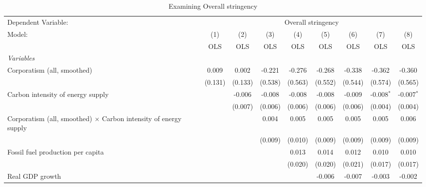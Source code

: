 
\begin{table}[htbp]
   \caption{Examining Overall stringency}
   \centering
   \begin{tabular}{lcccccccc}
      \toprule
      Dependent Variable: & \multicolumn{8}{c}{Overall stringency}\\
      Model:                                                                  & (1)     & (2)     & (3)     & (4)     & (5)     & (6)     & (7)          & (8)\\  
                                                                              &  OLS    & OLS     & OLS     & OLS     & OLS     & OLS     & OLS          & OLS\\  
      \midrule
      \emph{Variables}\\
      Corporatism (all, smoothed)                                             & 0.009   & 0.002   & -0.221  & -0.276  & -0.268  & -0.338  & -0.362       & -0.360\\   
                                                                              & (0.131) & (0.133) & (0.538) & (0.563) & (0.552) & (0.544) & (0.574)      & (0.565)\\   
      Carbon intensity of energy supply                                       &         & -0.006  & -0.008  & -0.008  & -0.008  & -0.009  & -0.008$^{*}$ & -0.007$^{*}$\\   
                                                                              &         & (0.007) & (0.006) & (0.006) & (0.006) & (0.006) & (0.004)      & (0.004)\\   
      Corporatism (all, smoothed) $\times$ Carbon intensity of energy supply  &         &         & 0.004   & 0.005   & 0.005   & 0.005   & 0.005        & 0.006\\   
                                                                              &         &         & (0.009) & (0.010) & (0.009) & (0.009) & (0.009)      & (0.009)\\   
      Fossil fuel production per capita                                       &         &         &         & 0.013   & 0.014   & 0.012   & 0.010        & 0.010\\   
                                                                              &         &         &         & (0.020) & (0.020) & (0.021) & (0.017)      & (0.017)\\   
      Real GDP growth                                                         &         &         &         &         & -0.006  & -0.007  & -0.003       & -0.002\\   

\end{tabular}
\end{table}
